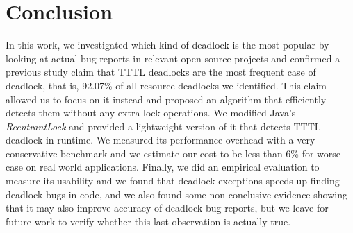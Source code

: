 \section{Conclusion}

In this work, we investigated which kind of deadlock is the most popular by looking at actual bug reports
in relevant open source projects and confirmed a previous study claim that TTTL deadlocks
are the most frequent case of deadlock, that is, 92.07\% of all resource deadlocks we identified.
This claim allowed us to focus on it instead and proposed an algorithm that
efficiently detects them without any extra lock operations.
We modified Java's \emph{ReentrantLock} and provided a lightweight
version of it that detects TTTL deadlock in runtime.
We measured its performance overhead with a very conservative benchmark
and we estimate our cost to be less than 6\% for worse case on real world applications.
Finally, we did an empirical evaluation to measure its usability and we found that
deadlock exceptions speeds up finding deadlock bugs in code, and we also found some
non-conclusive evidence showing that it may also improve accuracy of deadlock bug reports,
but we leave for future work to verify whether this last observation is actually true.